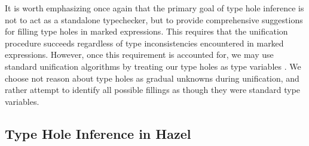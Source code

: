  It is worth emphasizing once again that the primary goal of type hole inference is not to act as a standalone typechecker, but to provide comprehensive suggestions for filling type holes in marked expressions. This requires that the unification procedure succeeds regardless of type inconsistencies encountered in marked expressions. However, once this requirement is accounted for, we may use standard unification algorithms by treating our type holes as type variables \cite{Huet}. We choose not reason about type holes as gradual unknowns during unification, and rather attempt to identify all possible fillings as though they were standard type variables. 





\subsection{Type Hole Inference in Hazel}

